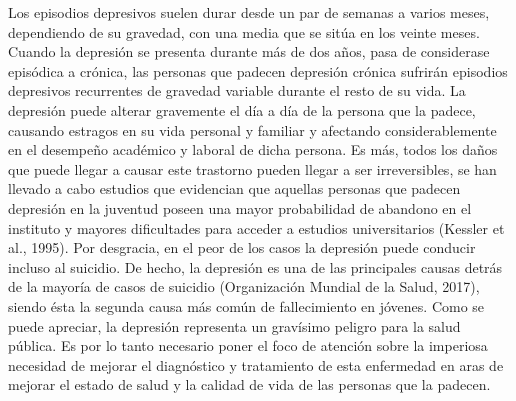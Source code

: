 Los episodios depresivos suelen durar desde un par de semanas a varios meses, dependiendo de su gravedad, con una media que se sitúa en los veinte meses. Cuando la depresión se presenta durante más de dos años, pasa de considerase episódica a crónica, las personas que padecen depresión crónica sufrirán episodios depresivos recurrentes de gravedad variable durante el resto de su vida.
La depresión puede alterar gravemente el día a día de la persona que la padece, causando estragos en su vida personal y familiar y afectando considerablemente en el desempeño académico y laboral de dicha persona.
Es más, todos los daños que puede llegar a causar este trastorno pueden llegar a ser irreversibles, se han llevado a cabo estudios que evidencian que aquellas personas que padecen depresión en la juventud poseen una mayor probabilidad de abandono en el instituto y mayores dificultades para acceder a estudios universitarios (Kessler et al., 1995).
Por desgracia, en el peor de los casos la depresión puede conducir incluso al suicidio. De hecho, la depresión es una de las principales causas detrás de la mayoría de casos de suicidio (Organización Mundial de la Salud, 2017), siendo ésta la segunda causa más común de fallecimiento en jóvenes. 
Como se puede apreciar, la depresión representa un gravísimo peligro para la salud pública. Es por lo tanto necesario poner el foco de atención sobre la imperiosa necesidad de mejorar el diagnóstico y tratamiento de esta enfermedad en aras de mejorar el estado de salud y la calidad de vida de las personas que la padecen.

